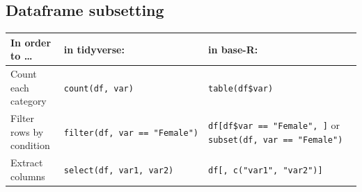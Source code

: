 \documentclass[
]{book}
\theoremstyle{definition}
\theoremstyle{definition}
\theoremstyle{definition}
\theoremstyle{remark}
\begin{document}
\hypertarget{dataframe-subsetting}{%
\subsection*{Dataframe subsetting}\label{dataframe-subsetting}}

\begin{longtable}[]{@{}lll@{}}
\toprule
\begin{minipage}[b]{0.29\columnwidth}\raggedright
In order to \ldots{}\strut
\end{minipage} & \begin{minipage}[b]{0.33\columnwidth}\raggedright
in tidyverse:\strut
\end{minipage} & \begin{minipage}[b]{0.30\columnwidth}\raggedright
in base-R:\strut
\end{minipage}\tabularnewline
\midrule
\endhead
\begin{minipage}[t]{0.29\columnwidth}\raggedright
Count each category\strut
\end{minipage} & \begin{minipage}[t]{0.33\columnwidth}\raggedright
\texttt{count(df,\ var)}\strut
\end{minipage} & \begin{minipage}[t]{0.30\columnwidth}\raggedright
\texttt{table(df\$var)}\strut
\end{minipage}\tabularnewline
\begin{minipage}[t]{0.29\columnwidth}\raggedright
Filter rows by condition\strut
\end{minipage} & \begin{minipage}[t]{0.33\columnwidth}\raggedright
\texttt{filter(df,\ var\ ==\ "Female")}\strut
\end{minipage} & \begin{minipage}[t]{0.30\columnwidth}\raggedright
\texttt{df{[}df\$var\ ==\ "Female",\ {]}} or \texttt{subset(df,\ var\ ==\ "Female")}\strut
\end{minipage}\tabularnewline
\begin{minipage}[t]{0.29\columnwidth}\raggedright
Extract columns\strut
\end{minipage} & \begin{minipage}[t]{0.33\columnwidth}\raggedright
\texttt{select(df,\ var1,\ var2)}\strut
\end{minipage} & \begin{minipage}[t]{0.30\columnwidth}\raggedright
\texttt{df{[},\ c("var1",\ "var2"){]}}\strut

\end{minipage}
\end{longtable}
\end{document}
